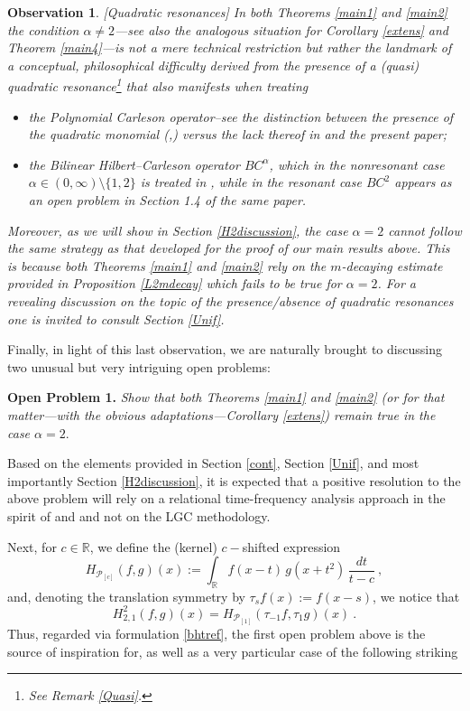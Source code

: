 \documentclass[a4paper,reqno]{amsart}
\numberwithin{equation}{section}
\newtheorem{observation}[theorem]{Observation}
\theoremstyle{definition}
\newcommand{\R}{\mathbb{R}}
\def\a{\alpha}
\begin{document}
\begin{observation} \label{alfa2}[\textsf{Quadratic resonances}]
	In both Theorems \ref{main1} and \ref{main2} the condition $\a\not=2$---see also the analogous situation for Corollary \ref{extens} and Theorem \ref{main4}---is not a mere technical restriction but rather the landmark of a conceptual, philosophical difficulty derived from the presence of a \emph{(quasi) quadratic resonance}\footnote{See Remark \ref{Quasi}.} that also manifests when treating\
	\begin{itemize}
		\item the Polynomial Carleson operator--see the distinction between the presence of the quadratic monomial (\cite{Lie09},\cite{Lie20}) versus the lack thereof in \cite{Lie19} and the present paper;
		\item the Bilinear Hilbert--Carleson operator $BC^{\a}$, which in the nonresonant case $\a\in(0,\infty)\setminus\{1,2\}$ is treated in \cite{BBLV21}, while in the resonant case $BC^{2}$ appears as an open problem in Section 1.4 of the same paper.
	\end{itemize}
	 Moreover, as we will show in Section \ref{H2discussion}, the case $\a=2$ cannot follow the same strategy as that developed for the proof of our main results above. This is because both Theorems \ref{main1} and \ref{main2} rely on the $m$-decaying estimate provided in Proposition \ref{L2mdecay} which fails to be true for $\a=2$. For a revealing discussion on the topic of the presence/absence of quadratic resonances one is invited to consult Section \ref{Unif}.
\end{observation}

Finally, in light of this last observation, we are naturally brought to discussing two unusual but very intriguing open problems:
\medskip

\noindent\textbf{Open Problem 1.} \emph{Show that both Theorems \ref{main1} and \ref{main2} (or for that matter---with the obvious adaptations---Corollary \ref{extens}) remain true in the case $\a=2$}.
\medskip

Based on the elements provided in Section \ref{cont}, Section \ref{Unif}, and most importantly Section \ref{H2discussion},  it is expected that a positive resolution to the above problem will rely on a relational time-frequency analysis approach in the spirit of \cite{Lie09} and \cite{Lie20} and not on the LGC methodology.

Next, for $c\in\R$, we define the (kernel) $c-$shifted expression
\begin{equation}\label{bhtrefc}
H_{\mathcal{P}_{[c]}}(f,g)(x):= \int_\R f(x-t)\, g(x+t^2)\,\frac{dt}{t-c}\:,
\end{equation}
and, denoting the translation symmetry by $\tau_{s}f(x):=f(x-s)$, we notice that
\begin{equation}\label{bhtref}
		H_{2,1}^2(f,g)(x)=H_{\mathcal{P}_{[1]}}(\tau_{-1}f,\tau_{1}g)(x)\:.
\end{equation}
Thus, regarded via formulation \eqref{bhtref}, the first open problem above is the source of inspiration for, as well as a very particular case of the following striking
\medskip
\end{document}
